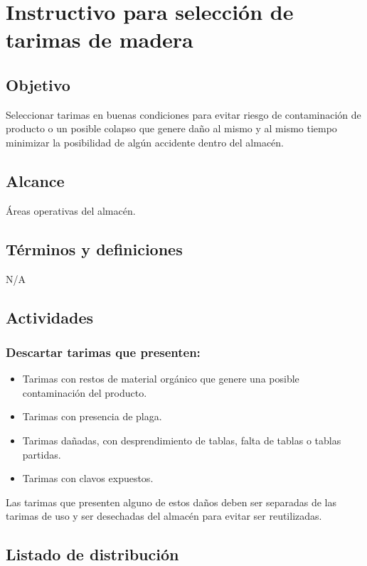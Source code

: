 \thispagestyle{formato-PI}
\renewcommand{\MayorVer}{2}
\renewcommand{\MenorVer}{0}
\renewcommand{\Codigo}{PSA-1-PROG} %
\renewcommand{\FechaPub}{2023--01}
\renewcommand{\Titulo}{Instructivo para selección de tarimas de madera}

\section{\Titulo}

\subsection{Objetivo}

Seleccionar tarimas en buenas condiciones para evitar riesgo de contaminación de producto o un posible colapso que genere daño al mismo y al mismo tiempo minimizar la posibilidad de algún accidente dentro del almacén.

\subsection{Alcance}

Áreas operativas del almacén.

\subsection{Términos y definiciones}

N/A



\subsection{Actividades}

\subsubsection{Descartar tarimas que presenten:}

\begin{itemize}
	\item Tarimas con restos de material orgánico que genere una posible contaminación del producto.
	\item Tarimas con presencia de plaga.
	\item Tarimas dañadas, con desprendimiento de tablas, falta de tablas o tablas partidas.
	\item Tarimas con clavos expuestos.
\end{itemize}

Las tarimas que presenten alguno de estos daños deben ser separadas de las tarimas de uso y ser desechadas del almacén para evitar ser reutilizadas.

\subsection{Listado de distribución}

